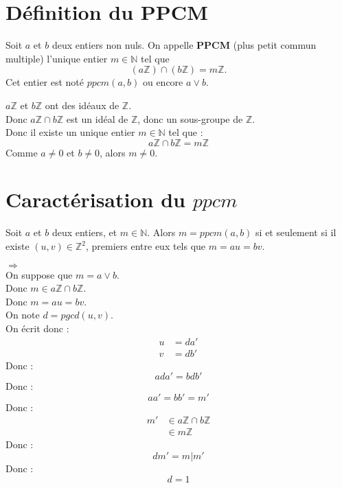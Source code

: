 \documentclass[../main.tex]{subfiles}
\begin{document}
\setcounter{section}{43}
\section{Définition du PPCM}

\begin{tcolorbox}[title=Propostion 12.44, title filled=false, colframe=lightblue, colback=lightblue!10!white]
    Soit $a$ et $b$ deux entiers non nuls. On appelle \textbf{PPCM} (plus petit commun multiple) l'unique entier $m \in \mathbb{N}$ tel que
    $$(a \mathbb{Z}) \cap (b \mathbb{Z}) = m \mathbb{Z}.$$
    Cet entier est noté $ppcm(a,b)$ ou encore $a \vee b$.
\end{tcolorbox}

$a \mathbb{Z}$ et $b \mathbb{Z}$ ont des idéaux de $\mathbb{Z}$. \\
Donc $a \mathbb{Z} \cap b \mathbb{Z}$ est un idéal de $\mathbb{Z}$, donc un sous-groupe de $\mathbb{Z}$. \\
Donc il existe un unique entier $m \in \mathbb{N}$ tel que :
$$a \mathbb{Z} \cap b \mathbb{Z} = m \mathbb{Z}$$
Comme $a \neq 0$ et $b \neq 0$, alors $m \neq 0$. 

\section{Caractérisation du $ppcm$}
\begin{tcolorbox}[title=Propostion 12.45, title filled=false, colframe=lightblue, colback=lightblue!10!white]
    Soit $a$ et $b$ deux entiers, et $m \in \mathbb{N}$. Alors $m = ppcm(a,b)$ si et seulement si il existe $(u, v) \in \mathbb{Z}^2$, premiers entre eux tels que $m = au = bv$. 
\end{tcolorbox}

$\boxed{\Rightarrow}$ \\
On suppose que $m = a \vee b$. \\
Donc $m \in a \mathbb{Z} \cap b \mathbb{Z}$. \\
Donc $m = au = bv$. \\
On note $d = pgcd(u,v)$. \\
On écrit donc : 
\begin{align*}
    u &= da' \\
    v &= db'
\end{align*}
Donc : 
$$ada' = bdb'$$
Donc : 
$$aa' = bb' = m'$$
Donc : 
\begin{align*}
    m' &\in a \mathbb{Z} \cap b \mathbb{Z} \\
    &\in m \mathbb{Z}
\end{align*}
Donc : 
$$dm' = m | m'$$
Donc : 
$$d = 1$$
\end{document}

